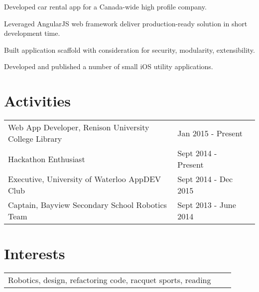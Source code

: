 \documentclass[]{deedy-resume-openfont}
\begin{document}
\begin{minipage}[t]{0.66\textwidth}
\begin{tightemize}
\item Developed car rental app for a Canada-wide high profile company.\item Leveraged AngularJS web framework deliver production-ready solution in
short development time.\item Built application scaffold with consideration for security, modularity, extensibility.
\end{tightemize}
\sectionsep

\begin{tightemize}
\item Developed and published a number of small iOS utility applications.
\end{tightemize}
\sectionsep

%

\section{Activities} 
\begin{tabular}{lll}
Web App Developer, Renison University College Library & Jan 2015 - Present \\
Hackathon Enthusiast & Sept 2014 - Present\\
Executive, University of Waterloo AppDEV Club & Sept 2014 - Dec 2015\\
Captain, Bayview Secondary School Robotics Team & Sept 2013 - June 2014\\
\end{tabular}
\sectionsep

%

\section{Interests} 

\begin{tabular}{rll}
Robotics, design, refactoring code, racquet sports, reading \\
\end{tabular}
\sectionsep

\end{minipage} 
\end{document}
